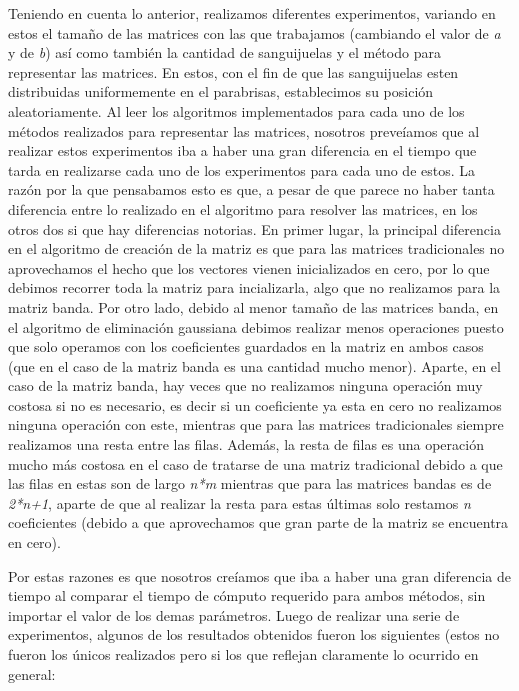 \documentclass[10pt, a4paper]{article}
\begin{document}
Teniendo en cuenta lo anterior, realizamos diferentes experimentos, variando en estos el tamaño de las matrices con las que trabajamos (cambiando el valor de \textit{a} y de \textit{b}) as\'i como tambi\'en la cantidad de sanguijuelas y el m\'etodo para representar las matrices. En estos, con el fin de que las sanguijuelas esten distribuidas uniformemente en el parabrisas, establecimos su posici\'on aleatoriamente. Al leer los algoritmos implementados para cada uno de los m\'etodos realizados para representar las matrices, nosotros preve\'iamos que al realizar estos experimentos iba a haber una gran diferencia en el tiempo que tarda en realizarse cada uno de los experimentos para cada uno de estos. La raz\'on por la que pensabamos esto es que, a pesar de que parece no haber tanta diferencia entre lo realizado en el algoritmo para resolver las matrices, en los otros dos si que hay diferencias notorias. En primer lugar, la principal diferencia en el algoritmo de creaci\'on de la matriz es que para las matrices tradicionales no aprovechamos el hecho que los vectores vienen inicializados en cero, por lo que debimos recorrer toda la matriz para incializarla, algo que no realizamos para la matriz banda. Por otro lado, debido al menor tamaño de las matrices banda, en el algoritmo de eliminaci\'on gaussiana debimos realizar menos operaciones puesto que solo operamos con los coeficientes guardados en la matriz en ambos casos (que en el caso de la matriz banda es una cantidad mucho menor). Aparte, en el caso de la matriz banda, hay veces que no realizamos ninguna operaci\'on muy costosa si no es necesario, es decir si un coeficiente ya esta en cero no realizamos ninguna operaci\'on con este, mientras que para las matrices tradicionales siempre realizamos una resta entre las filas. Adem\'as, la resta de filas es una operaci\'on mucho m\'as costosa en el caso de tratarse de una matriz tradicional debido a que las filas en estas son de largo \textit{n*m} mientras que para las matrices bandas es de \textit{2*n+1}, aparte de que al realizar la resta para estas \'ultimas solo restamos \textit{n} coeficientes (debido a que aprovechamos que gran parte de la matriz se encuentra en cero).

Por estas razones es que nosotros cre\'iamos que iba a haber una gran diferencia de tiempo al comparar el tiempo de c\'omputo requerido para ambos m\'etodos, sin importar el valor de los demas par\'ametros. Luego de realizar una serie de experimentos, algunos de los resultados obtenidos fueron los siguientes (estos no fueron los \'unicos realizados pero si los que reflejan claramente lo ocurrido en general:
\end{document}
